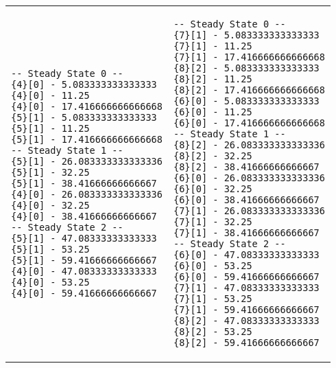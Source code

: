 \begin{center}
    \begin{tabular}{ p{5cm} | p{5cm}}
	\begin{verbatim}
-- Steady State 0 --
{4}[0] - 5.083333333333333
{4}[0] - 11.25
{4}[0] - 17.416666666666668
{5}[1] - 5.083333333333333
{5}[1] - 11.25
{5}[1] - 17.416666666666668
-- Steady State 1 --
{5}[1] - 26.083333333333336
{5}[1] - 32.25
{5}[1] - 38.41666666666667
{4}[0] - 26.083333333333336
{4}[0] - 32.25
{4}[0] - 38.41666666666667
-- Steady State 2 --
{5}[1] - 47.08333333333333
{5}[1] - 53.25
{5}[1] - 59.41666666666667
{4}[0] - 47.08333333333333
{4}[0] - 53.25
{4}[0] - 59.41666666666667
\end{verbatim}
&
	\begin{verbatim}
-- Steady State 0 --
{7}[1] - 5.083333333333333
{7}[1] - 11.25
{7}[1] - 17.416666666666668
{8}[2] - 5.083333333333333
{8}[2] - 11.25
{8}[2] - 17.416666666666668
{6}[0] - 5.083333333333333
{6}[0] - 11.25
{6}[0] - 17.416666666666668
-- Steady State 1 --
{8}[2] - 26.083333333333336
{8}[2] - 32.25
{8}[2] - 38.41666666666667
{6}[0] - 26.083333333333336
{6}[0] - 32.25
{6}[0] - 38.41666666666667
{7}[1] - 26.083333333333336
{7}[1] - 32.25
{7}[1] - 38.41666666666667
-- Steady State 2 --
{6}[0] - 47.08333333333333
{6}[0] - 53.25
{6}[0] - 59.41666666666667
{7}[1] - 47.08333333333333
{7}[1] - 53.25
{7}[1] - 59.41666666666667
{8}[2] - 47.08333333333333
{8}[2] - 53.25
{8}[2] - 59.41666666666667
\end{verbatim}
    \end{tabular}
\end{center}